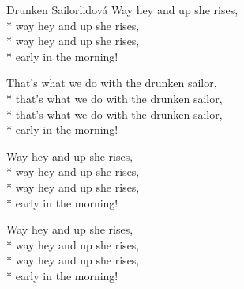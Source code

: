 \documentclass[10.5pt]{book}
\begin{document}
\begin{poem}{Drunken Sailor}{lidová}
Way hey and up she rises,\\*
way hey and up she rises,\\*
way hey and up she rises,\\*
early in the morning!

That’s what we do with the drunken sailor,\\*
that’s what we do with the drunken sailor,\\*
that’s what we do with the drunken sailor,\\*
early in the morning!

Way hey and up she rises,\\*
way hey and up she rises,\\*
way hey and up she rises,\\*
early in the morning!

Way hey and up she rises,\\*
way hey and up she rises,\\*
way hey and up she rises,\\*
early in the morning!

\end{poem}
\end{document}

